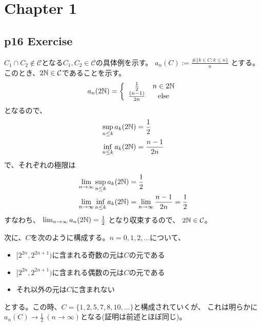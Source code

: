 \section{Chapter 1}
    \subsection{p16 Exercise}
        $C_1\cap C_2\not\in\mathcal{C}$となる$C_1, C_2\in\mathcal{C}$の具体例を示す。
        $a_n(C) := \frac{\#\{k\in C; k\leq n\}}{n}$
        とする。このとき、$2{\mathbb{N}}\in\mathcal{C}$であることを示す。
        \begin{align*}
            a_n(2{\mathbb{N}}) = \left \{
            \begin{array}{cc}
                \frac{1}{2} & n\in 2{\mathbb{N}}\\
                \frac{(n-1)}{2 n} & \mathrm{else}
            \end{array}
            \right.
        \end{align*}
        となるので、
        \begin{align*}
            \sup_{n\leq k} a_k(2{\mathbb{N}}) &= \frac{1}{2} \\
            \inf_{n\leq k} a_k(2{\mathbb{N}}) &= \frac{n-1}{2n}
        \end{align*}
        で、それぞれの極限は
        \begin{align*}
            \lim_{n\to\infty}\sup_{n\leq k} a_k(2{\mathbb{N}}) &= \frac{1}{2} \\
            \lim_{n\to\infty}\inf_{n\leq k} a_k(2{\mathbb{N}}) &= \lim_{n\to\infty}\frac{n-1}{2n} = \frac{1}{2}
        \end{align*}
        すなわち、
        $\lim_{n\to\infty} a_n(2{\mathbb{N}}) = \frac{1}{2}$
        となり収束するので、
        $2{\mathbb{N}}\in\mathcal{C}$。

        次に、$C$を次のように構成する。$n = 0,1,2,\ldots$について、
        \begin{itemize}
            \item $[2^{2n}, 2^{2n + 1})$に含まれる奇数の元は$C$の元である
            \item $[2^{2n}, 2^{2n + 1})$に含まれる偶数の元は$C$の元である
            \item それ以外の元は$C$に含まれない
        \end{itemize}
        とする。この時、$C = \{1,2,5,7,8,10,\ldots\}$と構成されていくが、
        これは明らかに$a_n(C)\to\frac{1}{2}\ (n\to\infty)$となる(証明は前述とほぼ同じ)。
            
